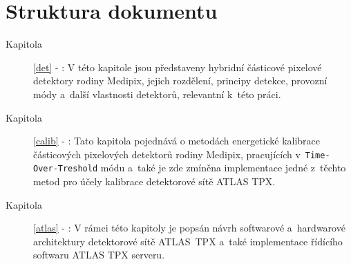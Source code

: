 \section{Struktura dokumentu}
\begin{description}
	\item[Kapitola] \ref{det} - :
		V této kapitole jsou představeny hybridní částicové pixelové detektory rodiny Medipix, jejich rozdělení, principy detekce, provozní módy a~další vlastnosti detektorů, relevantní k~této práci.
	\item[Kapitola] \ref{calib} - :
		Tato kapitola pojednává o metodách energetické kalibrace částicových pixelových detektorů rodiny Medipix, pracujících v~\texttt{Time-Over-Treshold} módu a~také je zde zmíněna implementace jedné z~těchto metod pro účely kalibrace detektorové sítě ATLAS TPX.
	\item[Kapitola] \ref{atlas} - :
		V rámci této kapitoly je popsán návrh softwarové a~hardwarové architektury detektorové sítě ATLAS~TPX a~také implementace řídícího softwaru ATLAS TPX serveru.
\end{description}
